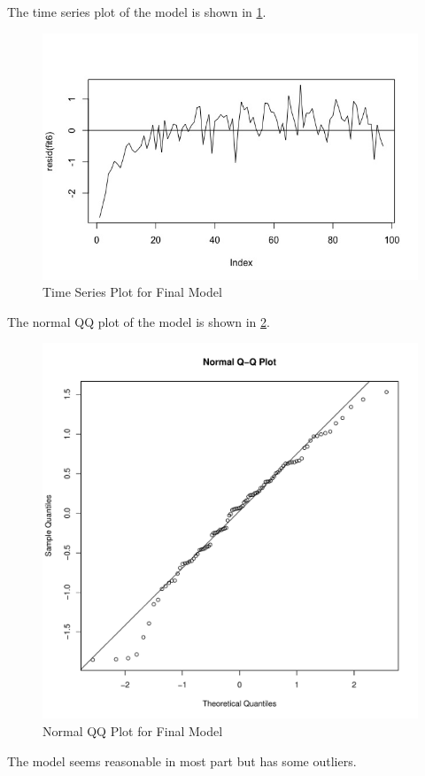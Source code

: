 \documentclass[12pt,letterpaper,titlepage,en-US]{article}
\begin{document}
The time series plot of the model is shown in \cref{timefit6}.
\begin{figure}[H]
    \centering
    \caption{Time Series Plot for Final Model}\label{timefit6}

    \includegraphics[width=.85\textwidth]{fig/fit6time.jpeg}

\end{figure}

The normal QQ plot of the model is shown in \cref{qqfit6}.

\begin{figure}[H]
    \centering
    \caption{Normal QQ Plot for Final Model}\label{qqfit6}
    \includegraphics[width=.85\textwidth]{fig/qqnormplotfit6.pdf}
\end{figure}

The model seems reasonable in most part but has some outliers.
\end{document}
